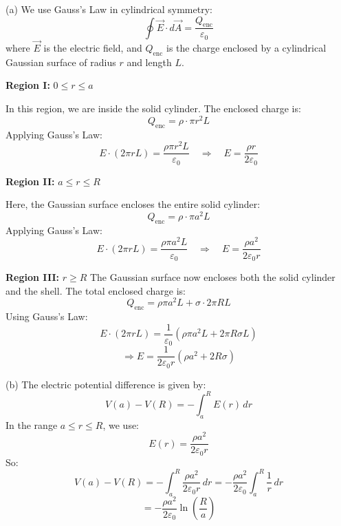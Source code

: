 \begin{solution}
(a) We use Gauss's Law in cylindrical symmetry:
\[
    \oint \vec{E} \cdot d\vec{A} = \frac{Q_{\text{enc}}}{\varepsilon_0}
    \]
    where $\vec{E}$ is the electric field, and $Q_{\text{enc}}$ is the charge enclosed by a cylindrical Gaussian surface of radius $r$ and length $L$.

\noindent
\textbf{Region I:} $0 \leq r \leq a$

\noindent
In this region, we are inside the solid cylinder. The enclosed charge is:
    \[
    Q_{\text{enc}} = \rho \cdot \pi r^2 L
    \]
    Applying Gauss's Law:
    \[
    E \cdot (2\pi r L) = \frac{\rho \pi r^2 L}{\varepsilon_0}
    \quad \Rightarrow \quad
    E = \frac{\rho r}{2\varepsilon_0}
    \]

\noindent
\textbf{Region II:} $a \leq r \leq R$

\noindent
Here, the Gaussian surface encloses the entire solid cylinder:
    \[
    Q_{\text{enc}} = \rho \cdot \pi a^2 L
    \]
    Applying Gauss’s Law:
    \[
    E \cdot (2\pi r L) = \frac{\rho \pi a^2 L}{\varepsilon_0}
    \quad \Rightarrow \quad
    E = \frac{\rho a^2}{2\varepsilon_0 r}
    \]

\noindent
\textbf{Region III:} $r \geq R$
\noindent
    The Gaussian surface now encloses both the solid cylinder and the shell. The total enclosed charge is:
    \[
    Q_{\text{enc}} = \rho \pi a^2 L + \sigma \cdot 2\pi R L
    \]
    Using Gauss’s Law:
    \[
    E \cdot (2\pi r L) = \frac{1}{\varepsilon_0} \left( \rho \pi a^2 L + 2\pi R \sigma L \right)
    \]
    \[
    \Rightarrow E = \frac{1}{2\varepsilon_0 r} \left( \rho a^2 + 2R \sigma \right)
    \]

\noindent
(b) The electric potential difference is given by:
    \[
    V(a) - V(R) = -\int_a^R E(r) \, dr
    \]
    In the range $a \leq r \leq R$, we use:
    \[
    E(r) = \frac{\rho a^2}{2\varepsilon_0 r}
    \]
    So:
    \[
    V(a) - V(R) = -\int_a^R \frac{\rho a^2}{2\varepsilon_0 r} \, dr
    = -\frac{\rho a^2}{2\varepsilon_0} \int_a^R \frac{1}{r} \, dr
    \]
    \[
    = -\frac{\rho a^2}{2\varepsilon_0} \ln\left( \frac{R}{a} \right)
    \]
\end{solution}




